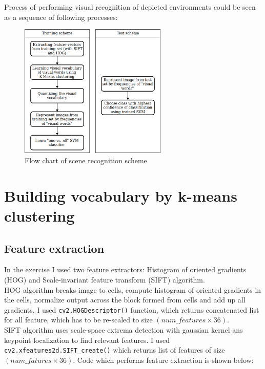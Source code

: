 Process of performing visual recognition of depicted environments could be seen as a sequence of following processes:

\begin{figure}[H]
    \centering
    \includegraphics[width=7cm]{flow_scene_recognition.jpg}
    \caption{Flow chart of scene recognition scheme}
    \label{fig:flowchart_scene_recognition}
\end{figure}

\section*{Building vocabulary by k-means clustering}

    \subsection*{Feature extraction}
In the exercise I used two feature extractors: Histogram of oriented gradients (HOG) and Scale-invariant feature transform (SIFT) algorithm.\\
HOG algorithm breaks image to cells, compute histogram of oriented gradients in the cells, normalize output across the block formed from cells and add up all gradients. I used \texttt{cv2.HOGDescriptor()} function, which returns concatenated list for all feature, which has to be re-scaled to size $(num\_features \times 36)$.\\
SIFT algorithm uses scale-space extrema detection with gaussian kernel ans keypoint localization to find relevant features. I used \texttt{cv2.xfeatures2d.SIFT\_create()} which returns list of features of size $(num\_fatures \times 36)$. Code which performs feature extraction is shown below:

